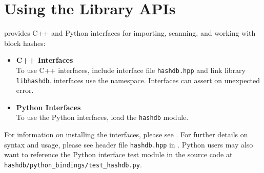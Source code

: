 \documentclass[11pt,fleqn]{article} %
\begin{document}
\section{Using the \hdb Library APIs}
\label{APIs}
\hdb provides C++ and Python interfaces for importing, scanning, and working with block hashes:

\begin{itemize}
\item \textbf{C++ Interfaces}\\
To use C++ interfaces, include interface file \verb+hashdb.hpp+ and link \hdb library \verb+libhashdb+. \hdb interfaces use the \hdb namespace. Interfaces can assert on unexpected error.
\item \textbf{Python Interfaces}\\
To use the Python interfaces, load the \verb+hashdb+ module.
\end{itemize}

For information on installing the \hdb interfaces, please see \textbf{}.  For further details on syntax and usage, please see \hdb header file \texttt{hashdb.hpp} in \textbf{}. Python users may also want to reference the Python interface test module in the source code at \verb+hashdb/python_bindings/test_hashdb.py+.\\
\end{document}
